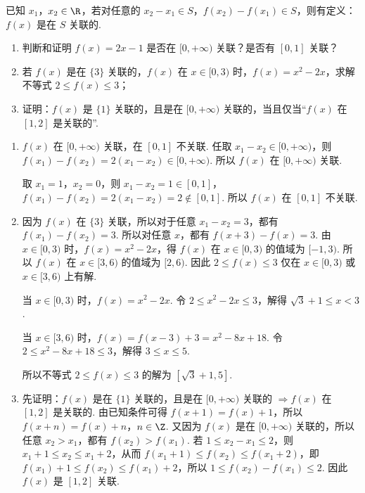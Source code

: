 \begin{problem}
已知 \(x_1\)，\(x_2\in \R\)，若对任意的 \(x_2-x_1\in S\)，\(f(x_2)-f(x_1)\in S\)，则有定义：\(f(x)\) 是在 \(S\) 关联的.

\begin{enumerate}
\item 判断和证明 \(f(x)=2x-1\) 是否在 \([0,+\infty)\) 关联？是否有 \([0,1]\) 关联？
\item 若 \(f(x)\) 是在 \(\{3\}\) 关联的，\(f(x)\) 在 \(x\in[0,3)\) 时，\(f(x)=x^2-2x\)，求解不等式 \(2\le f(x)\le 3\)；
\item 证明：\(f(x)\) 是 \(\{1\}\) 关联的，且是在 \([0,+\infty)\) 关联的，当且仅当“\(f(x)\) 在 \([1,2]\) 是关联的”.
\end{enumerate}
\end{problem}

\begin{solution}
\begin{enumerate}
\item \(f(x)\) 在 \([0,+\infty)\) 关联，在 \([0,1]\) 不关联. 任取 \(x_1-x_2\in[0,+\infty)\)，则 \(f(x_1)-f(x_2)=2\left( x_1-x_2 \right)\in[0,+\infty)\). 所以 \(f(x)\) 在 \([0,+\infty)\) 关联.

取 \(x_1=1\)，\(x_2=0\)，则 \(x_1-x_2=1\in[0,1]\)，\(f(x_1)-f(x_2)=2\left( x_1-x_2 \right)=2\notin[0,1]\). 所以 \(f(x)\) 在 \([0,1]\) 不关联.

\item 因为 \(f(x)\) 在 \(\{3\}\) 关联，所以对于任意 \(x_1-x_2=3\)，都有 \(f(x_1)-f(x_2)=3\). 所以对任意 \(x\)，都有 \(f(x+3)-f(x)=3\). 由 \(x\in[0,3)\) 时，\(f(x)=x^2-2x\)，得 \(f(x)\) 在 \(x\in[0,3)\) 的值域为 \([-1,3)\). 所以 \(f(x)\) 在 \(x\in[3,6)\) 的值域为 \([2,6)\). 因此 \(2\le f(x)\le 3\) 仅在 \(x\in[0,3)\) 或 \(x\in[3,6)\) 上有解.

当 \(x\in[0,3)\) 时，\(f(x)=x^2-2x\). 令 \(2\le x^2-2x\le 3\)，解得 \(\sqrt3+1\le x<3\).

当 \(x\in[3,6)\) 时，\(f(x)=f(x-3)+3=x^2-8x+18\). 令 \(2\le x^2-8x+18\le 3\)，解得 \(3\le x\le 5\).

所以不等式 \(2\le f(x)\le 3\) 的解为 \([\sqrt3+1,5]\).

\item 先证明：\(f(x)\) 是在 \(\{1\}\) 关联的，且是在 \([0,+\infty)\) 关联的 \(\Rightarrow f(x)\) 在 \([1,2]\) 是关联的. 由已知条件可得 \(f(x+1)=f(x)+1\)，所以 \(f(x+n)=f(x)+n\)，\(n\in \Z\). 又因为 \(f(x)\) 是在 \([0,+\infty)\) 关联的，所以任意 \(x_2>x_1\)，都有 \(f(x_2)>f(x_1)\). 若 \(1\le x_2-x_1\le 2\)，则 \(x_1+1\le x_2\le x_1+2\)，从而 \(f(x_1+1)\le f(x_2)\le f(x_1+2)\)，即 \(f(x_1)+1\le f(x_2)\le f(x_1)+2\)，所以 \(1\le f(x_2)-f(x_1)\le 2\). 因此 \(f(x)\) 是 \([1,2]\) 关联.


\end{enumerate}
\end{solution}
